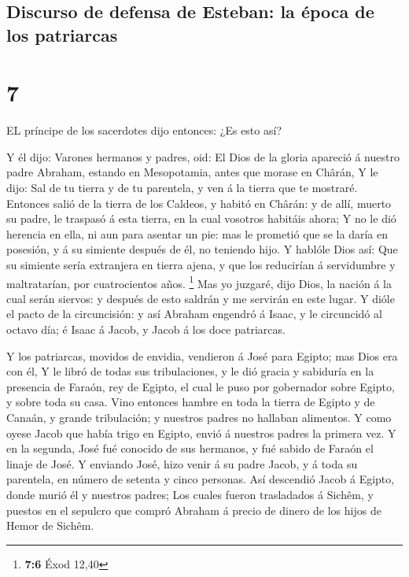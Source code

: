 \hypertarget{discurso-de-defensa-de-esteban-la-uxe9poca-de-los-patriarcas}{%
\subsection{Discurso de defensa de Esteban: la época de los
patriarcas}\label{discurso-de-defensa-de-esteban-la-uxe9poca-de-los-patriarcas}}

\hypertarget{section-6}{%
\section{7}\label{section-6}}

 EL príncipe de los sacerdotes dijo entonces: ¿Es esto así?

 Y él dijo: Varones hermanos y padres, oid: El Dios de la
gloria apareció á nuestro padre Abraham, estando en Mesopotamia, antes
que morase en Chârán,  Y le dijo: Sal de tu tierra y de tu
parentela, y ven á la tierra que te mostraré.  Entonces
salió de la tierra de los Caldeos, y habitó en Chârán: y de allí, muerto
su padre, le traspasó á esta tierra, en la cual vosotros habitáis ahora;
 Y no le dió herencia en ella, ni aun para asentar un pie:
mas le prometió que se la daría en posesión, y á su simiente después de
él, no teniendo hijo.  Y hablóle Dios así: Que su simiente
sería extranjera en tierra ajena, y que los reducirían á servidumbre y
maltratarían, por cuatrocientos años. \footnote{\textbf{7:6} Éxod 12,40}
 Mas yo juzgaré, dijo Dios, la nación á la cual serán
siervos: y después de esto saldrán y me servirán en este lugar.
 Y dióle el pacto de la circuncisión: y así Abraham engendró
á Isaac, y le circuncidó al octavo día; é Isaac á Jacob, y Jacob á los
doce patriarcas.

 Y los patriarcas, movidos de envidia, vendieron á José para
Egipto; mas Dios era con él,  Y le libró de todas sus
tribulaciones, y le dió gracia y sabiduría en la presencia de Faraón,
rey de Egipto, el cual le puso por gobernador sobre Egipto, y sobre toda
su casa.  Vino entonces hambre en toda la tierra de Egipto
y de Canaán, y grande tribulación; y nuestros padres no hallaban
alimentos.  Y como oyese Jacob que había trigo en Egipto,
envió á nuestros padres la primera vez.  Y en la segunda,
José fué conocido de sus hermanos, y fué sabido de Faraón el linaje de
José.  Y enviando José, hizo venir á su padre Jacob, y á
toda su parentela, en número de setenta y cinco personas. 
Así descendió Jacob á Egipto, donde murió él y nuestros padres;
 Los cuales fueron trasladados á Sichêm, y puestos en el
sepulcro que compró Abraham á precio de dinero de los hijos de Hemor de
Sichêm.

